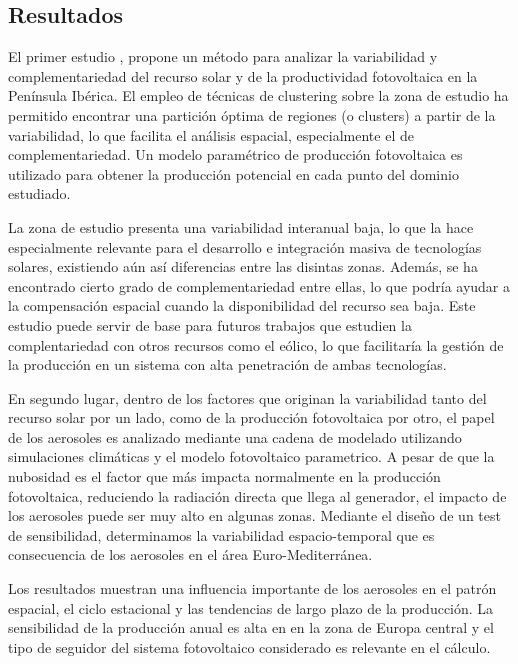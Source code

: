 \subsection{Resultados}

El primer estudio \cite*{Gutierrez2017}, propone un método para analizar la variabilidad y complementariedad del recurso solar y de la productividad fotovoltaica en la Península Ibérica. El empleo de técnicas de clustering sobre la zona de estudio ha permitido encontrar una partición óptima de regiones (o clusters) a partir de la variabilidad, lo que facilita el análisis espacial, especialmente el de complementariedad. Un modelo paramétrico de producción fotovoltaica es utilizado para obtener la producción potencial en cada punto del dominio estudiado.

La zona de estudio presenta una variabilidad interanual baja, lo que la hace especialmente relevante para el desarrollo e integración masiva de tecnologías solares, existiendo aún así diferencias entre las disintas zonas. Además, se ha encontrado cierto grado de complementariedad entre ellas, lo que podría ayudar a la compensación espacial cuando la disponibilidad del recurso sea baja. Este estudio puede servir de base para futuros trabajos que estudien la complentariedad con otros recursos como el eólico, lo que facilitaría la gestión de la producción en un sistema con alta penetración de ambas tecnologías.\\

\starbreak

En segundo lugar, dentro de los factores que originan la variabilidad tanto del recurso solar por un lado, como de la producción fotovoltaica por otro, el papel de los aerosoles es analizado mediante una cadena de modelado utilizando simulaciones climáticas y el modelo fotovoltaico parametrico. A pesar de que la nubosidad es el factor que más impacta normalmente en la producción fotovoltaica, reduciendo la radiación directa que llega al generador, el impacto de los aerosoles puede ser muy alto en algunas zonas. Mediante el diseño de un test de sensibilidad, determinamos la variabilidad espacio-temporal que es consecuencia de los aerosoles en el área Euro-Mediterránea.

Los resultados \cite*{Gutierrez2018} muestran una influencia importante de los aerosoles en el patrón espacial, el ciclo estacional y las tendencias de largo plazo de la producción. La sensibilidad de la producción anual es alta en en la zona de Europa central y el tipo de seguidor del sistema fotovoltaico considerado es relevante en el cálculo.

